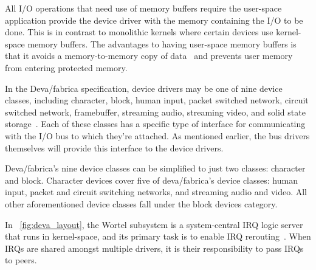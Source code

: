 All I/O operations that need use of memory buffers require
the user-space application provide the device driver with the memory
containing the I/O to be done.  This is in contrast to monolithic kernels
where certain devices use kernel-space memory buffers.  The advantages to
having user-space memory buffers is that it avoids a memory-to-memory
copy of data~\cite{hurdl4ref2003, mckusick1996, l4ref2005} and prevents
user memory from entering protected memory.


In the Deva/fabrica specification, device drivers may be one of nine device classes, including
character, block, human input, packet switched network, circuit switched
network, framebuffer, streaming audio, streaming video, and solid state
storage~\cite{hurdl4ref2003}.  Each of these classes has a specific type of
interface for communicating with the I/O bus to which they're attached.  As
mentioned earlier, the bus drivers themselves will provide this interface to
the device drivers.

Deva/fabrica's nine device classes can be simplified to just
two classes: {\important character} and {\important block}.  Character
devices cover five of deva/fabrica's device classes: human input,
packet and circuit switching networks, and streaming audio and video.
All other aforementioned device classes fall under the block devices
category.



In \figurename~\ref{fig:deva_layout}, the
{\important Wortel} subsystem is a system-central IRQ logic
server that runs in kernel-space, and its primary
task is to enable IRQ rerouting~\cite{hurdl4ref2003}.  When IRQs are
shared amongst multiple drivers, it is their responsibility to pass
IRQs to peers.
 
